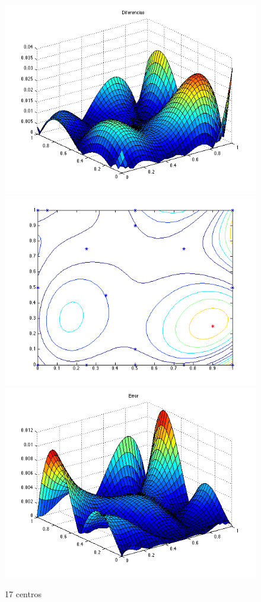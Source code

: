 \documentclass[11pt,a4paper]{article}
\begin{document}
\begin{figure}[H]
\centering

\includegraphics[scale=0.35]{diferencias17.png}
\includegraphics[scale=0.35]{centros17.png}
\includegraphics[scale=0.35]{error17.png}
\caption{17 centros}
\end{figure}
\end{document}
